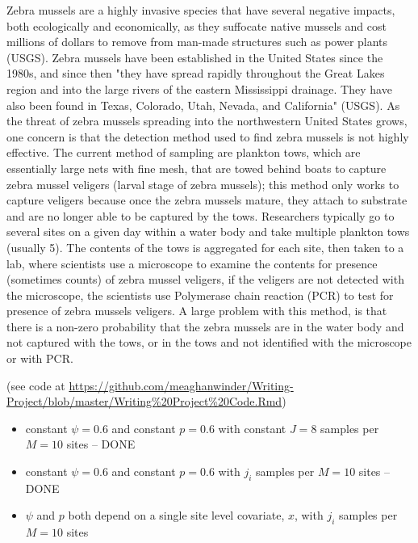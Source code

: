 \documentclass[12pt]{article}\usepackage[]{graphicx}\usepackage[]{color}
\begin{document}
Zebra mussels are a highly invasive species that have several negative impacts, both ecologically and economically, as they suffocate native mussels and cost millions of dollars to remove from man-made structures such as power plants (USGS). Zebra mussels have been established in the United States since the 1980s, and since then "they have spread rapidly throughout the Great Lakes region and into the large rivers of the eastern Mississippi drainage. They have also been found in Texas, Colorado, Utah, Nevada, and California" (USGS). As the threat of zebra mussels spreading into the northwestern United States grows, one concern is that the detection method used to find zebra mussels is not highly effective. The current method of sampling are plankton tows, which are essentially large nets with fine mesh, that are towed behind boats to capture zebra mussel veligers (larval stage of zebra mussels); this method only works to capture veligers because once the zebra mussels mature, they attach to substrate and are no longer able to be captured by the tows. Researchers typically go to several sites on a given day within a water body and take multiple plankton tows (usually 5). The contents of the tows is aggregated for each site, then taken to a lab, where scientists use a microscope to examine the contents for presence (sometimes counts) of zebra mussel veligers, if the veligers are not detected with the microscope, the scientists use Polymerase chain reaction (PCR) to  test for presence of zebra mussels veligers. A large problem with this method, is that there is a non-zero probability that the zebra mussels are in the water body and not captured with the tows, or in the tows and not identified with the microscope or with PCR. 

 (see code at \url{https://github.com/meaghanwinder/Writing-Project/blob/master/Writing%20Project%20Code.Rmd})

\begin{itemize}
\item constant $\psi = 0.6$ and constant $p = 0.6$ with constant $J = 8$ samples per $M = 10$ sites -- DONE
\item constant $\psi = 0.6$ and constant $p = 0.6$ with $j_i$ samples per $M = 10$ sites -- DONE
\item $\psi$ and $p$ both depend on a single site level covariate, $x$, with $j_i$ samples per $M = 10$ sites 
\end{itemize}
\end{document}
